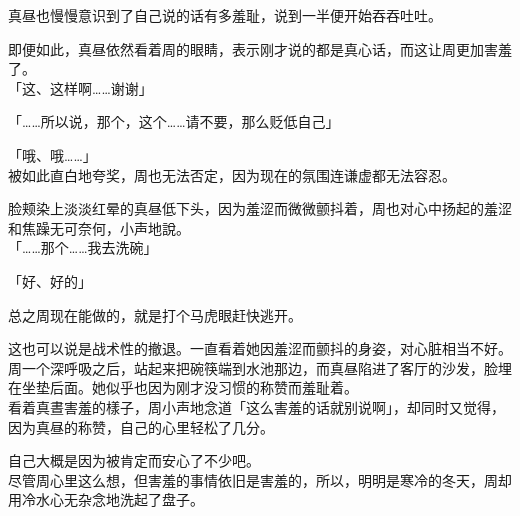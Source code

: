真昼也慢慢意识到了自己说的话有多羞耻，说到一半便开始吞吞吐吐。

即便如此，真昼依然看着周的眼睛，表示刚才说的都是真心话，而这让周更加害羞了。\\

「这、这样啊……谢谢」

「……所以说，那个，这个……请不要，那么贬低自己」

「哦、哦……」\\

被如此直白地夸奖，周也无法否定，因为现在的氛围连谦虚都无法容忍。

脸颊染上淡淡红晕的真昼低下头，因为羞涩而微微颤抖着，周也对心中扬起的羞涩和焦躁无可奈何，小声地說。\\

「……那个……我去洗碗」

「好、好的」

总之周现在能做的，就是打个马虎眼赶快逃开。

这也可以说是战术性的撤退。一直看着她因羞涩而颤抖的身姿，对心脏相当不好。\\

周一个深呼吸之后，站起来把碗筷端到水池那边，而真昼陷进了客厅的沙发，脸埋在坐垫后面。她似乎也因为刚才没习惯的称赞而羞耻着。\\

看着真晝害羞的樣子，周小声地念道「这么害羞的话就别说啊」，却同时又觉得，因为真昼的称赞，自己的心里轻松了几分。

自己大概是因为被肯定而安心了不少吧。\\%

尽管周心里这么想，但害羞的事情依旧是害羞的，所以，明明是寒冷的冬天，周却用冷水心无杂念地洗起了盘子。
